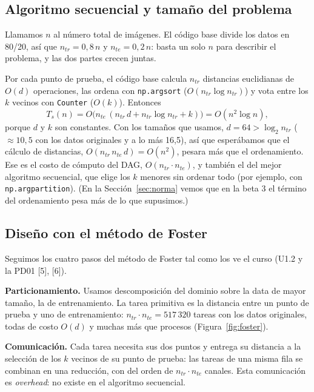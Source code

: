 \documentclass[11pt,a4paper]{article}
\newcommand{\ntr}{n_{tr}}
\newcommand{\nte}{n_{te}}
\begin{document}
\subsection{Algoritmo secuencial y tamaño del problema}
\label{sec:secuencial}

Llamamos $n$ al número total de imágenes. El código base divide los datos en 80/20, así que $\ntr = 0{,}8\,n$ y $\nte = 0{,}2\,n$: basta un solo $n$ para describir el problema, y las dos partes crecen juntas.

Por cada punto de prueba, el código base calcula $\ntr$ distancias euclidianas de $O(d)$ operaciones, las ordena con \texttt{np.argsort} ($O(\ntr\log\ntr)$) y vota entre los $k$ vecinos con \texttt{Counter} ($O(k)$). Entonces
\[
T_s(n) = O\big(\nte\,(\ntr\, d + \ntr \log \ntr + k)\big) = O(n^2 \log n),
\]
porque $d$ y $k$ son constantes. Con los tamaños que usamos, $d = 64 > \log_2 \ntr$ ($\approx 10{,}5$ con los datos originales y a lo más 16,5), así que esperábamos que el cálculo de distancias, $O(\ntr\,\nte\,d) = O(n^2)$, pesara más que el ordenamiento. Ese es el costo de cómputo del DAG, $O(\ntr\cdot\nte)$, y también el del mejor algoritmo secuencial, que elige los $k$ menores sin ordenar todo (por ejemplo, con \texttt{np.argpartition}). (En la Sección~\ref{sec:norma} vemos que en la beta 3 el término del ordenamiento pesa más de lo que supusimos.)

\subsection{Diseño con el método de Foster}
\label{sec:foster}

Seguimos los cuatro pasos del método de Foster tal como los ve el curso (U1.2 y la PD01 [5], [6]).

\textbf{Particionamiento.} Usamos descomposición del dominio sobre la data de mayor tamaño, la de entrenamiento. La tarea primitiva es la distancia entre un punto de prueba y uno de entrenamiento: $\ntr\cdot\nte = 517\,320$ tareas con los datos originales, todas de costo $O(d)$ y muchas más que procesos (Figura~\ref{fig:foster}).

\textbf{Comunicación.} Cada tarea necesita sus dos puntos y entrega su distancia a la selección de los $k$ vecinos de su punto de prueba: las tareas de una misma fila se combinan en una reducción, con del orden de $\ntr\cdot\nte$ canales. Esta comunicación es \textit{overhead}: no existe en el algoritmo secuencial.
\end{document}
